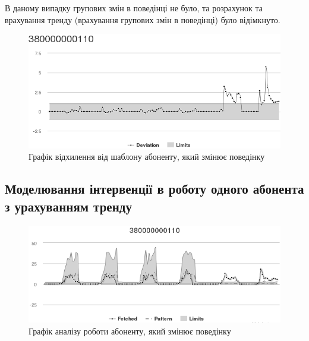 В даному випадку групових змін в поведінці не було, та розрахунок та врахування тренду (врахування групових змін в поведінці) було відімкнуто.

\begin{figure}[h!]
        \begin{center}
            \includegraphics[scale=0.55]{resources/oneIntervWithoutTrend/dev.png}
        \end{center}
        \caption{Графік відхилення від шаблону абоненту, який змінює поведінку}
        \label{fig:model_oneIntervWithoutTrend_dev_int}
\end{figure}

\label{oneIntervWithoutTrend}

\subsection{Моделювання інтервенції в роботу одного абонента з урахуванням тренду}
\begin{figure}[h!]
        \begin{center}
            \includegraphics[scale=0.55]{resources/oneIntervWithTrend/analysis-int.png}
        \end{center}
        \caption{Графік аналізу роботи абоненту, який змінює поведінку}
        \label{fig:model_oneIntervWithTrend_analysis_int}
\end{figure}

